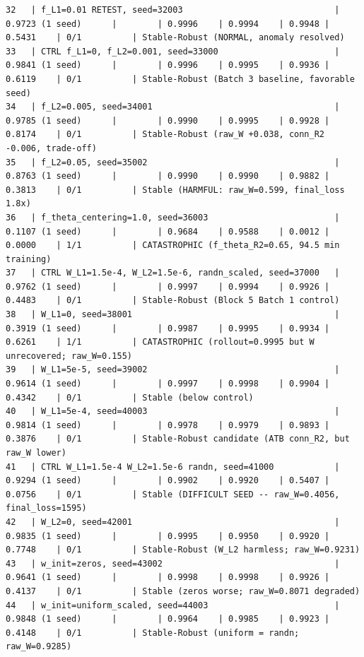\begin{tiny}
\begin{verbatim}
32   | f_L1=0.01 RETEST, seed=32003                              | 0.9723 (1 seed)      |        | 0.9996    | 0.9994    | 0.9948 | 0.5431    | 0/1          | Stable-Robust (NORMAL, anomaly resolved)
33   | CTRL f_L1=0, f_L2=0.001, seed=33000                       | 0.9841 (1 seed)      |        | 0.9996    | 0.9995    | 0.9936 | 0.6119    | 0/1          | Stable-Robust (Batch 3 baseline, favorable seed)
34   | f_L2=0.005, seed=34001                                    | 0.9785 (1 seed)      |        | 0.9990    | 0.9995    | 0.9928 | 0.8174    | 0/1          | Stable-Robust (raw_W +0.038, conn_R2 -0.006, trade-off)
35   | f_L2=0.05, seed=35002                                     | 0.8763 (1 seed)      |        | 0.9990    | 0.9990    | 0.9882 | 0.3813    | 0/1          | Stable (HARMFUL: raw_W=0.599, final_loss 1.8x)
36   | f_theta_centering=1.0, seed=36003                         | 0.1107 (1 seed)      |        | 0.9684    | 0.9588    | 0.0012 | 0.0000    | 1/1          | CATASTROPHIC (f_theta_R2=0.65, 94.5 min training)
37   | CTRL W_L1=1.5e-4, W_L2=1.5e-6, randn_scaled, seed=37000   | 0.9762 (1 seed)      |        | 0.9997    | 0.9994    | 0.9926 | 0.4483    | 0/1          | Stable-Robust (Block 5 Batch 1 control)
38   | W_L1=0, seed=38001                                        | 0.3919 (1 seed)      |        | 0.9987    | 0.9995    | 0.9934 | 0.6261    | 1/1          | CATASTROPHIC (rollout=0.9995 but W unrecovered; raw_W=0.155)
39   | W_L1=5e-5, seed=39002                                     | 0.9614 (1 seed)      |        | 0.9997    | 0.9998    | 0.9904 | 0.4342    | 0/1          | Stable (below control)
40   | W_L1=5e-4, seed=40003                                     | 0.9814 (1 seed)      |        | 0.9978    | 0.9979    | 0.9893 | 0.3876    | 0/1          | Stable-Robust candidate (ATB conn_R2, but raw_W lower)
41   | CTRL W_L1=1.5e-4 W_L2=1.5e-6 randn, seed=41000            | 0.9294 (1 seed)      |        | 0.9902    | 0.9920    | 0.5407 | 0.0756    | 0/1          | Stable (DIFFICULT SEED -- raw_W=0.4056, final_loss=1595)
42   | W_L2=0, seed=42001                                        | 0.9835 (1 seed)      |        | 0.9995    | 0.9950    | 0.9920 | 0.7748    | 0/1          | Stable-Robust (W_L2 harmless; raw_W=0.9231)
43   | w_init=zeros, seed=43002                                  | 0.9641 (1 seed)      |        | 0.9998    | 0.9998    | 0.9926 | 0.4137    | 0/1          | Stable (zeros worse; raw_W=0.8071 degraded)
44   | w_init=uniform_scaled, seed=44003                         | 0.9848 (1 seed)      |        | 0.9964    | 0.9985    | 0.9923 | 0.4148    | 0/1          | Stable-Robust (uniform = randn; raw_W=0.9285)

\end{verbatim}
\end{tiny}
